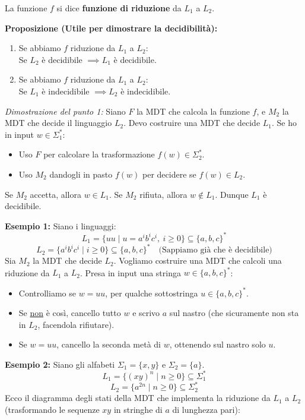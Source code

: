 La funzione $f$ si dice \textbf{funzione di riduzione} da $L_1$ a $L_2$.

\vspace{0.4cm}
\textbf{Proposizione (Utile per dimostrare la decidibilità):}
\begin{enumerate}
    \item Se abbiamo $f$ riduzione da $L_1$ a $L_2$: \\
    Se $L_2$ è decidibile $\implies L_1$ è decidibile.
    \item Se abbiamo $f$ riduzione da $L_1$ a $L_2$: \\
    Se $L_1$ è indecidibile $\implies L_2$ è indecidibile.
\end{enumerate}

\vspace{0.2cm}
\textit{Dimostrazione del punto 1:}
Siano $F$ la MDT che calcola la funzione $f$, e $M_2$ la MDT che decide il linguaggio $L_2$.
Devo costruire una MDT che decide $L_1$.
Se ho in input $w \in \Sigma_1^*$:
\begin{itemize}
    \item Uso $F$ per calcolare la trasformazione $f(w) \in \Sigma_2^*$.
    \item Uso $M_2$ dandogli in pasto $f(w)$ per decidere se $f(w) \in L_2$.
\end{itemize}
Se $M_2$ accetta, allora $w \in L_1$. Se $M_2$ rifiuta, allora $w \notin L_1$. Dunque $L_1$ è decidibile.

\vspace{0.6cm}
\textbf{Esempio 1:}
Siano i linguaggi:
$$ L_1 = \{uu \mid u = a^i b^i c^i, \ i \ge 0\} \subseteq \{a,b,c\}^* $$
$$ L_2 = \{a^i b^i c^i \mid i \ge 0\} \subseteq \{a,b,c\}^* \quad \text{(Sappiamo già che è decidibile)} $$
Sia $M_2$ la MDT che decide $L_2$. 
Vogliamo costruire una MDT che calcoli una riduzione da $L_1$ a $L_2$. 
Presa in input una stringa $w \in \{a,b,c\}^*$:
\begin{itemize}
    \item Controlliamo se $w = uu$, per qualche sottostringa $u \in \{a,b,c\}^*$.
    \item Se \underline{non} è così, cancello tutto $w$ e scrivo $a$ sul nastro (che sicuramente non sta in $L_2$, facendola rifiutare).
    \item Se $w = uu$, cancello la seconda metà di $w$, ottenendo sul nastro solo $u$.
\end{itemize}

\vspace{0.6cm}
\textbf{Esempio 2:}
Siano gli alfabeti $\Sigma_1 = \{x, y\}$ e $\Sigma_2 = \{a\}$.
$$ L_1 = \{(xy)^n \mid n \ge 0\} \subseteq \Sigma_1^* $$
$$ L_2 = \{a^{2n} \mid n \ge 0\} \subseteq \Sigma_2^* $$
Ecco il diagramma degli stati della MDT che implementa la riduzione da $L_1$ a $L_2$ (trasformando le sequenze $xy$ in stringhe di $a$ di lunghezza pari):

